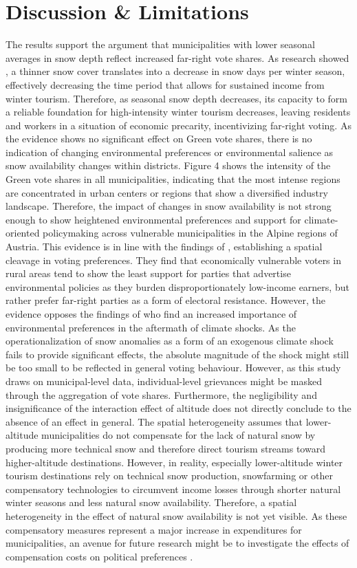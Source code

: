 \documentclass{article}
\begin{document}
\section{Discussion \& Limitations}
The results support the argument that municipalities with lower seasonal averages in snow depth reflect increased far-right vote shares. As research showed \citep{Olefs2020}, a thinner snow cover translates into a decrease in snow days per winter season, effectively decreasing the time period that allows for sustained income from winter tourism. Therefore, as  seasonal snow depth decreases, its capacity to form a reliable foundation for high-intensity winter tourism decreases, leaving residents and workers in a situation of economic precarity, incentivizing far-right voting. As the evidence shows no significant effect on Green vote shares, there is no indication of changing environmental preferences or environmental salience as snow availability changes within districts. Figure 4 shows the intensity of the Green vote shares in all municipalities, indicating that the most intense regions are concentrated in urban centers or regions that show a diversified industry landscape. Therefore, the impact of changes in snow availability is not strong enough to show heightened environmental preferences and support for climate-oriented policymaking across vulnerable municipalities in the Alpine regions of Austria. This evidence is in line with the findings of \textcite{Halikiopoulou_Vrakopoulos_Arndt_2026}, establishing a spatial cleavage in voting preferences. They find that economically vulnerable voters in rural areas tend to show the least support for parties that advertise  environmental policies as they burden disproportionately low-income earners, but rather prefer far-right parties as a form of electoral resistance. 
However, the evidence opposes the findings of \textcite{baccini2021} who find an increased importance of environmental preferences in the aftermath of climate shocks. As the operationalization of snow anomalies as a form of an exogenous climate shock fails to provide significant effects, the absolute magnitude of the shock might still be too small to be reflected in general voting behaviour. However, as this study draws on municipal-level data, individual-level grievances might be masked through the aggregation of vote shares. 
Furthermore, the negligibility and insignificance of the interaction effect of altitude does not directly conclude to the absence of an effect in general. The spatial heterogeneity assumes that lower-altitude municipalities do not compensate for the lack of natural snow by producing more technical snow and therefore direct tourism streams toward higher-altitude destinations. However, in reality, especially lower-altitude winter tourism destinations rely on technical snow production, snowfarming or other compensatory technologies to circumvent income losses through shorter natural winter seasons and less natural snow availability. Therefore, a spatial heterogeneity in the effect of natural snow availability is not yet visible. As these compensatory measures represent a major increase in expenditures for municipalities, an avenue for future research might be to investigate the effects of compensation costs on political preferences . 
\end{document}
